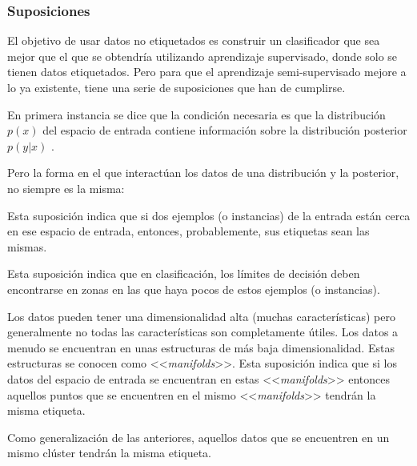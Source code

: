 \subsubsection{Suposiciones}
El objetivo de usar datos no etiquetados es construir un clasificador que sea
mejor que el que se obtendría utilizando aprendizaje supervisado, donde solo se
tienen datos etiquetados. Pero para que el aprendizaje semi-supervisado mejore a
lo ya existente, tiene una serie de suposiciones que han de cumplirse.

En primera instancia se dice que la condición necesaria es que la distribución
$p(x)$ del espacio de entrada contiene información sobre la distribución
posterior $p(y|x)$ \cite{vanEngelen2020}.

Pero la forma en el que interactúan los datos de una distribución y la posterior,
no siempre es la misma:

\begin{tcolorbox}[colback=cyan!5!white,colframe=cyan!75!black,title=\textit{Smoothness assumption}]
    Esta suposición indica que si dos ejemplos (o instancias) de la entrada
    están cerca en ese espacio de entrada, entonces, probablemente, sus
    etiquetas sean las mismas.
\end{tcolorbox}

\begin{tcolorbox}[colback=cyan!5!white,colframe=cyan!75!black,title=\textit{Low-density assumption}]
    Esta suposición indica que en clasificación, los límites de decisión deben
    encontrarse en zonas en las que haya pocos de estos ejemplos (o instancias).
\end{tcolorbox}

\begin{tcolorbox}[colback=cyan!5!white,colframe=cyan!75!black,title=\textit{Manifold assumption}]
    Los datos pueden tener una dimensionalidad alta (muchas características)
    pero generalmente no todas las características son completamente útiles. Los
    datos a menudo se encuentran en unas estructuras de más baja
    dimensionalidad. Estas estructuras se conocen como <<\emph{manifolds}>>.
    Esta suposición indica que si los datos del espacio de entrada se encuentran
    en estas <<\emph{manifolds}>> entonces aquellos puntos que se encuentren en
    el mismo <<\emph{manifolds}>> tendrán la misma etiqueta.
    \cite{towardsdatascience:semi,vanEngelen2020}
\end{tcolorbox}

\begin{tcolorbox}[colback=cyan!5!white,colframe=cyan!75!black,title=\textit{Cluster assumption}]
    Como generalización de las anteriores, aquellos datos que se encuentren en
    un mismo clúster tendrán la misma etiqueta.
\end{tcolorbox}


